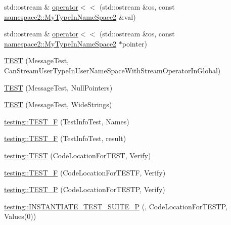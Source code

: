\begin{DoxyCompactItemize}
\item 
std\+::ostream \& \mbox{\hyperlink{_obj__test_2lib_2googletest-master_2googletest_2test_2gtest__unittest_8cc_ab3cbb7adaeba5049e2c1907523f0c3e8}{operator$<$$<$}} (std\+::ostream \&os, const \mbox{\hyperlink{classnamespace2_1_1_my_type_in_name_space2}{namespace2\+::\+My\+Type\+In\+Name\+Space2}} \&val)
\item 
std\+::ostream \& \mbox{\hyperlink{_obj__test_2lib_2googletest-master_2googletest_2test_2gtest__unittest_8cc_a839d8a189a0c52bb7899a5b4b4b07ed1}{operator$<$$<$}} (std\+::ostream \&os, const \mbox{\hyperlink{classnamespace2_1_1_my_type_in_name_space2}{namespace2\+::\+My\+Type\+In\+Name\+Space2}} $\ast$pointer)
\item 
\mbox{\hyperlink{_obj__test_2lib_2googletest-master_2googletest_2test_2gtest__unittest_8cc_ad2b886ecfee880b5012c8d41b448f110}{T\+E\+ST}} (Message\+Test, Can\+Stream\+User\+Type\+In\+User\+Name\+Space\+With\+Stream\+Operator\+In\+Global)
\item 
\mbox{\hyperlink{_obj__test_2lib_2googletest-master_2googletest_2test_2gtest__unittest_8cc_a94b1c12b49eabc12e7418733576df02a}{T\+E\+ST}} (Message\+Test, Null\+Pointers)
\item 
\mbox{\hyperlink{_obj__test_2lib_2googletest-master_2googletest_2test_2gtest__unittest_8cc_a9c9e67e24350d636fa355b36ed230706}{T\+E\+ST}} (Message\+Test, Wide\+Strings)
\item 
\mbox{\hyperlink{namespacetesting_acd53db89097aba1468724d6446069b1e}{testing\+::\+T\+E\+S\+T\+\_\+F}} (Test\+Info\+Test, Names)
\item 
\mbox{\hyperlink{namespacetesting_ab00e29c00b3e29cdfa21d23b79dd3776}{testing\+::\+T\+E\+S\+T\+\_\+F}} (Test\+Info\+Test, result)
\item 
\mbox{\hyperlink{namespacetesting_af597d0ad4de0197141b78e9c1035e491}{testing\+::\+T\+E\+ST}} (Code\+Location\+For\+T\+E\+ST, Verify)
\item 
\mbox{\hyperlink{namespacetesting_a782ec43081903a0aaa6d009218eba2a8}{testing\+::\+T\+E\+S\+T\+\_\+F}} (Code\+Location\+For\+T\+E\+S\+TF, Verify)
\item 
\mbox{\hyperlink{namespacetesting_af05768b7e2f14652d2c4f274ba1a5544}{testing\+::\+T\+E\+S\+T\+\_\+P}} (Code\+Location\+For\+T\+E\+S\+TP, Verify)
\item 
\mbox{\hyperlink{namespacetesting_a91b2d3c4e8c89bcec13270ae8585d549}{testing\+::\+I\+N\+S\+T\+A\+N\+T\+I\+A\+T\+E\+\_\+\+T\+E\+S\+T\+\_\+\+S\+U\+I\+T\+E\+\_\+P}} (, Code\+Location\+For\+T\+E\+S\+TP, Values(0))
\item 

\end{DoxyCompactItemize}
